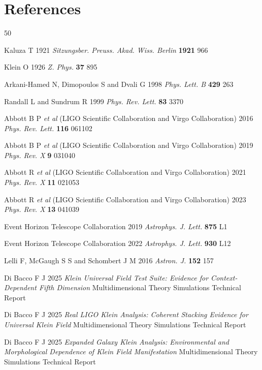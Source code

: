 \documentclass[12pt]{iopart}
\begin{document}
\section*{References}
\providecommand{\newblock}{}
\begin{thebibliography}{50}

Kaluza T 1921 \textit{Sitzungsber. Preuss. Akad. Wiss. Berlin} \textbf{1921} 966

Klein O 1926 \textit{Z. Phys.} \textbf{37} 895

Arkani-Hamed N, Dimopoulos S and Dvali G 1998 \textit{Phys. Lett. B} \textbf{429} 263

Randall L and Sundrum R 1999 \textit{Phys. Rev. Lett.} \textbf{83} 3370

Abbott B P \textit{et al} (LIGO Scientific Collaboration and Virgo Collaboration) 2016 \textit{Phys. Rev. Lett.} \textbf{116} 061102

Abbott B P \textit{et al} (LIGO Scientific Collaboration and Virgo Collaboration) 2019 \textit{Phys. Rev. X} \textbf{9} 031040

Abbott R \textit{et al} (LIGO Scientific Collaboration and Virgo Collaboration) 2021 \textit{Phys. Rev. X} \textbf{11} 021053

Abbott R \textit{et al} (LIGO Scientific Collaboration and Virgo Collaboration) 2023 \textit{Phys. Rev. X} \textbf{13} 041039

Event Horizon Telescope Collaboration 2019 \textit{Astrophys. J. Lett.} \textbf{875} L1

Event Horizon Telescope Collaboration 2022 \textit{Astrophys. J. Lett.} \textbf{930} L12

Lelli F, McGaugh S S and Schombert J M 2016 \textit{Astron. J.} \textbf{152} 157

Di Bacco F J 2025 \textit{Klein Universal Field Test Suite: Evidence for Context-Dependent Fifth Dimension} Multidimensional Theory Simulations Technical Report

Di Bacco F J 2025 \textit{Real LIGO Klein Analysis: Coherent Stacking Evidence for Universal Klein Field} Multidimensional Theory Simulations Technical Report

Di Bacco F J 2025 \textit{Expanded Galaxy Klein Analysis: Environmental and Morphological Dependence of Klein Field Manifestation} Multidimensional Theory Simulations Technical Report

\end{thebibliography}
\end{document}
